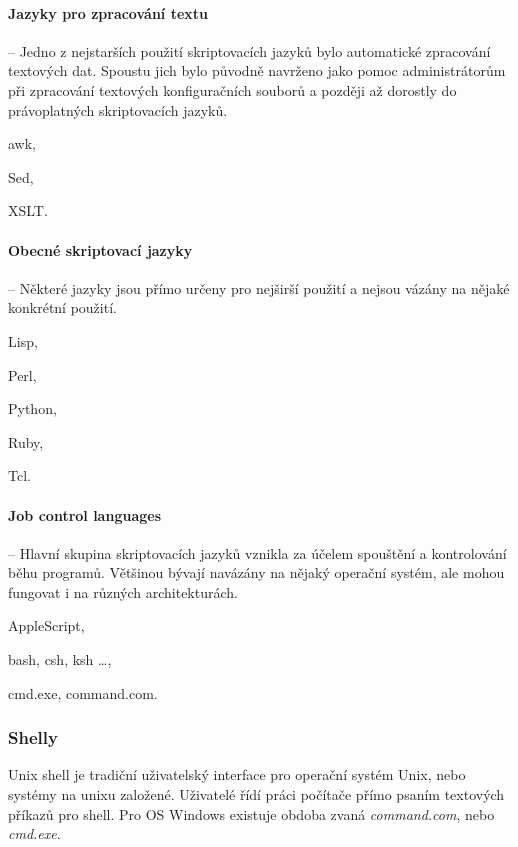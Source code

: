 \paragraph{Jazyky pro zpracování textu} -- Jedno z nejstarších použití
skriptovacích jazyků bylo automatické zpracování textových dat. Spoustu jich
bylo původně navrženo jako pomoc administrátorům při zpracování textových
konfiguračních souborů a později až dorostly do právoplatných skriptovacích
jazyků.
\begin{pitemize}
\item awk,
\item Sed,
\item XSLT.
\end{pitemize}

\paragraph{Obecné skriptovací jazyky} -- Některé jazyky jsou přímo určeny pro
nejširší použití a nejsou vázány na nějaké konkrétní použití. 
\begin{pitemize}
\item Lisp,
\item Perl,
\item Python,
\item Ruby,
\item Tcl.
\end{pitemize}

\paragraph{Job control languages} -- Hlavní skupina skriptovacích jazyků vznikla
za účelem spouštění a kontrolování běhu programů. Většinou bývají navázány na
nějaký operační systém, ale mohou fungovat i na různých architekturách.
\begin{pitemize}
\item AppleScript,
\item bash, csh, ksh \dots,
\item cmd.exe, command.com.
\end{pitemize}


\subsubsection*{Shelly}

Unix shell je tradiční uživatelský interface pro operační systém Unix, nebo
systémy na unixu založené. Uživatelé řídí práci počítače přímo psaním textových
příkazů pro shell. Pro OS Windows existuje obdoba zvaná \emph{command.com}, nebo
\emph{cmd.exe}.

